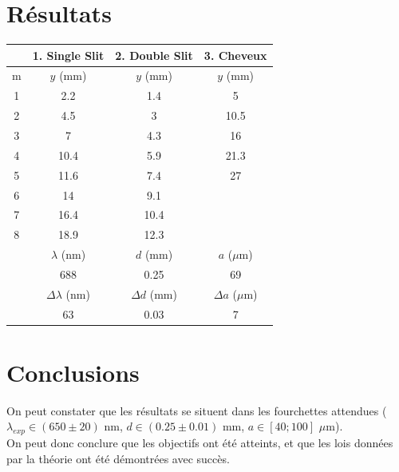 \documentclass[12pt,a4paper]{article}
\begin{document}
    \section{Résultats}
    \begin{minipage}{\textwidth}
        \centering
        \begin{tabular}{c|c|c|c}
            \toprule
              & 1. Single Slit & 2. Double Slit & 3. Cheveux \\
            \toprule
            m & $y$ (mm)  & $y$ (mm) & $y$ (mm) \\
            \midrule
            1 & 2.2  & 1.4  & 5    \\
            2 & 4.5  & 3    & 10.5 \\
            3 & 7    & 4.3  & 16   \\ 
            4 & 10.4 & 5.9  & 21.3 \\
            5 & 11.6 & 7.4  & 27   \\
            6 & 14   & 9.1  &      \\
            7 & 16.4 & 10.4 &      \\
            8 & 18.9 & 12.3 &      \\
            \toprule
              & $\lambda$ (nm) & $d$ (mm) & $a$ ($\mu$m) \\
            \toprule
              & 688 & 0.25 & 69 \\
            \toprule
              & $\Delta \lambda$ (nm) & $\Delta d$ (mm) & $\Delta a$ ($\mu$m) \\
            \toprule
              & 63 & 0.03 & 7 \\
            \bottomrule
        \end{tabular}
    \end{minipage}
    \section{Conclusions}
    On peut constater que les résultats se situent dans les fourchettes attendues ($\lambda_{exp} \in (650 \pm 20) \textrm{ nm}$, $d \in (0.25 \pm 0.01) \textrm{ mm}$, $a \in [40; 100]$ \textrm{$\mu$m}). \\
    On peut donc conclure que les objectifs ont été atteints, et que les lois données par la théorie ont été démontrées avec succès.
\end{document}
